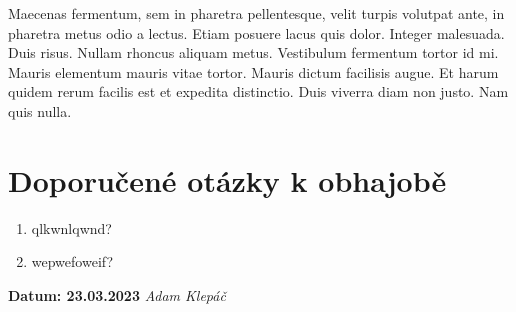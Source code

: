 \documentclass[a4paper,10pt]{article}
\begin{document}
Maecenas fermentum, sem in pharetra pellentesque, velit turpis volutpat ante, in pharetra metus odio a lectus. Etiam posuere lacus quis dolor. Integer malesuada. Duis risus. Nullam rhoncus aliquam metus. Vestibulum fermentum tortor id mi. Mauris elementum mauris vitae tortor. Mauris dictum facilisis augue. Et harum quidem rerum facilis est et expedita distinctio. Duis viverra diam non justo. Nam quis nulla.

\section*{\sffamily \centering Doporučené otázky k obhajobě}

\begin{enumerate}
  \item qlkwnlqwnd?
\item wepwefoweif?
\end{enumerate}

\vfill

\textbf{Datum:
23.03.2023
}
\hfill
\textit{
  Adam Klepáč
}
\end{document}
